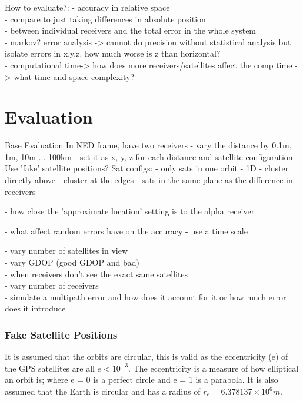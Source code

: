 


How to evaluate?:
- accuracy in relative space\\
- compare to just taking differences in absolute position \\
- between individual receivers and the total error in the whole system\\
- markov? error analysis -> cannot do precision without statistical analysis but isolate errors in x,y,z. how much worse is z than horizontal?\\
- computational time-> how does more receivers/satellites affect the comp time -> what time and space complexity?


\section{Evaluation}
Base Evaluation
In NED frame, have two receivers
- vary the distance by 0.1m, 1m, 10m ... 100km
- set it as x, y, z for each distance and satellite configuration
- Use 'fake' satellite positions?
Sat configs:
	- only sats in one orbit - 1D 
	- cluster directly above
	- cluster at the edges
	- sats in the same plane as the difference in receivers
	- 


- how close the 'approximate location' setting is to the alpha receiver

- what affect random errors have on the accuracy - use a time scale


- vary number of satellites in view\\
- vary GDOP (good GDOP and bad)\\
- when receivers don't see the exact same satellites \\
- vary number of receivers \\
- simulate a multipath error and how does it account for it or how much error does it introduce\\
\subsubsection{Fake Satellite Positions}
It is assumed that the orbits are circular, this is valid as the eccentricity (e) of the GPS satellites are all $e<10^{-3}$.  The eccentricity is a measure of how elliptical an orbit is; where e = 0 is a perfect circle and e = 1 is a parabola. It is also assumed that the Earth is circular and has a radius of 
$r_e = 6.378137\times10^6 m$.

